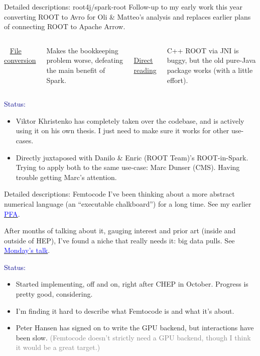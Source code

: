 \documentclass{beamer}
\begin{document}
\begin{frame}{Detailed descriptions: root4j/spark-root}
\vspace{0.5 cm}
Follow-up to my early work this year converting ROOT to Avro for Oli \& Matteo's analysis and replaces earlier plans of connecting ROOT to Apache Arrow.

\vspace{0.3 cm}
\begin{columns}[t]
\mbox{ } \hfill \underline{File conversion} \hfill \mbox{ }

\vspace{0.1 cm}
Makes the bookkeeping problem worse, defeating the main benefit of Spark.

\mbox{ } \hfill \underline{Direct reading} \hfill \mbox{ }

\vspace{0.1 cm}
C++ ROOT via JNI is buggy, but the old pure-Java package works (with a little effort).
\end{columns}

\vspace{0.4 cm}
\textcolor{darkblue}{Status:}
\begin{itemize}
\item Viktor Khristenko has completely taken over the codebase, and is actively using it on his own thesis. I just need to make sure it works for other use-cases.
\item Directly juxtaposed with Danilo \& Enric (ROOT Team)'s ROOT-in-Spark. Trying to apply both to the same use-case: Marc Dunser (CMS). Having trouble getting Marc's attention.
\end{itemize}
\end{frame}

\begin{frame}{Detailed descriptions: Femtocode}
\vspace{0.5 cm}
I've been thinking about a more abstract numerical language (an ``executable chalkboard'') for a long time. See my earlier \href{http://dmg.org/pfa/}{\textcolor{blue}{PFA}}.

\vspace{0.3 cm}
After months of talking about it, gauging interest and prior art (inside and outside of HEP), I've found a niche that really needs it: big data pulls. See \href{https://indico.cern.ch/event/594180/}{\textcolor{blue}{Monday's talk}}.

\vspace{0.4 cm}
\textcolor{darkblue}{Status:}
\begin{itemize}
\item Started implementing, off and on, right after CHEP in October. Progress is pretty good, considering.
\item I'm finding it hard to describe what Femtocode is and what it's about.
\item Peter Hansen has signed on to write the GPU backend, but interactions have been slow. \textcolor{gray}{(Femtocode doesn't strictly need a GPU backend, though I think it would be a great target.)}
\end{itemize}
\end{frame}
\end{document}

